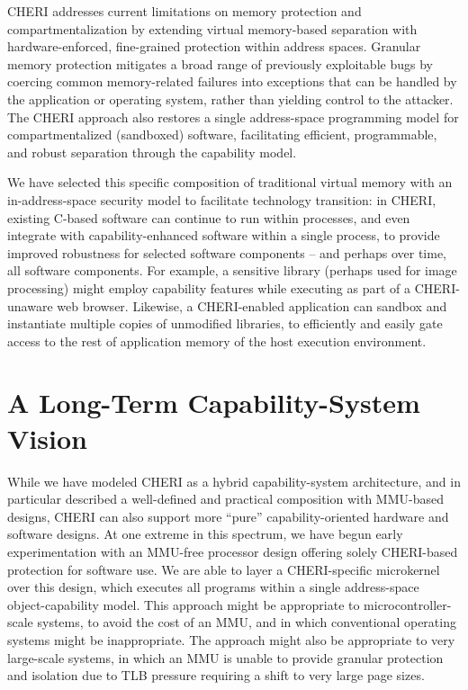 CHERI addresses current limitations on memory protection and compartmentalization by extending virtual
memory-based separation with hardware-enforced, fine-grained protection within address spaces.
Granular memory protection mitigates a broad range of previously exploitable bugs by coercing common memory-related failures into exceptions that can be handled by the application or operating system, rather than yielding control to the attacker.
The CHERI approach also restores a single address-space programming model for
compartmentalized (sandboxed) software, facilitating efficient, programmable, and robust
separation through the capability model.

We have selected this specific composition of traditional virtual memory with an
in-address-space security model to facilitate technology transition: in CHERI,
existing C-based software can continue to run within processes, and even
integrate with capability-enhanced software within a single process, to provide
improved robustness for selected software components -- and perhaps over time, all
software components.
For example, a sensitive library (perhaps used for image processing) might employ
capability features while executing as part of a CHERI-unaware web browser.
Likewise, a CHERI-enabled application can sandbox and instantiate multiple copies of
unmodified libraries, to efficiently and easily gate access to the rest of application
memory of the host execution environment.

\section{A Long-Term Capability-System Vision}

While we have modeled CHERI as a hybrid capability-system architecture, and in
particular described a well-defined and practical composition with MMU-based
designs, CHERI can also support more ``pure'' capability-oriented hardware and
software designs.
At one extreme in this spectrum, we have begun early experimentation with an
MMU-free processor design offering solely CHERI-based protection for software
use.
We are able to layer a CHERI-specific microkernel over this design, which
executes all programs within a single address-space object-capability model.
This approach might be appropriate to microcontroller-scale systems, to avoid
the cost of an MMU, and in which conventional operating systems might be
inappropriate.
The approach might also be appropriate to very large-scale systems, in which
an MMU is unable to provide granular protection and isolation due to TLB
pressure requiring a shift to very large page sizes.

